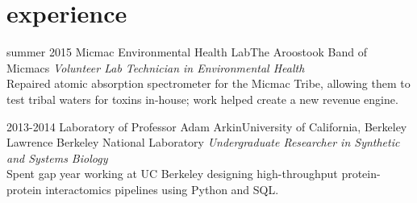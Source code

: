 \documentclass[11pt]{friggeri-cv} %
\begin{document}
\section{experience}
\begin{entrylist}
\entry
{summer 2015}
{Micmac Environmental Health Lab}{The Aroostook Band of Micmacs}
{\emph{Volunteer Lab Technician in Environmental Health} \\
Repaired atomic absorption spectrometer for the Micmac Tribe, allowing them to test tribal waters for toxins in-house; work helped create a new revenue engine.}

\entry
{2013-2014}
{Laboratory of Professor Adam Arkin}{University of California, Berkeley\\ {\null} \hfill {Lawrence Berkeley National Laboratory}}%
{\emph{Undergraduate Researcher in Synthetic and Systems Biology}\\
Spent gap year working at UC Berkeley designing high-throughput protein-protein interactomics pipelines using Python and SQL.}


\end{entrylist}
\end{document}
